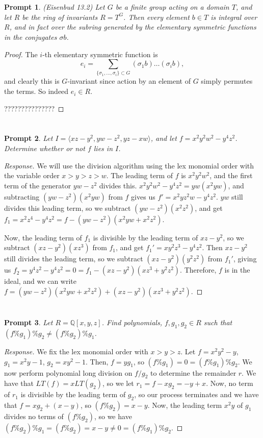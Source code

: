 \documentclass[Letter,12pt]{article}
\newcommand{\q}{\mathbb{Q}}
\newcommand{\<}{\left\langle}
\renewcommand{\>}{\right\rangle}
\newcommand{\prob}[1]{\setcounter{section}{#1-1}\section{}}
\newtheorem*{prompt*}{Prompt}
\theoremstyle{definition}
\begin{document}
	
	\prob{17}
	\begin{prompt*}
		(Eisenbud 13.2) Let $G$ be a finite group acting on a domain $T$, and let $R$ be the ring of invariants $R = T^G$. Then every element $b\in T$ is integral over $R$, and in fact over the subring generated by the elementary symmetric functions in the conjugates $\sigma b$.
	\end{prompt*}
	
	\begin{proof}
		The $i$-th elementary symmetric function is \[e_i = \sum_{\{\sigma_1, \ldots, \sigma_i\} \subset G} (\sigma_1 b)\ldots (\sigma_i b),\] and clearly this is $G$-invariant since action by an element of $G$ simply permutes the terms. So indeed $e_i\in R$.
		
		???????????????
	\end{proof}
	
	
	
	\prob{21}
	\begin{prompt*}
		Let $I = \langle xz-y^2, yw-z^2, yz-xw\rangle$, and let $f = x^2y^2w^2-y^4z^2$. Determine whether or not $f$ lies in $I$.
	\end{prompt*}
	\begin{proof}[Response]
		We will use the division algorithm using the lex monomial order with the variable order $x>y>z>w$. The leading term of $f$ is $x^2y^2w^2$, and the first term of the generator $yw-z^2$ divides this. $x^2y^2w^2-y^4z^2 = yw(x^2yw)$, and subtracting $(yw-z^2)(x^2yw)$ from $f$ gives us $f' = x^2yz^2w - y^4z^2$. $yw$ still divides this leading term, so we subtract $(yw-z^2)(x^2z^2)$, and get $f_1 = x^2z^4 - y^4z^2 = f - (yw-z^2)(x^2yw + x^2z^2)$.
		
		Now, the leading term of $f_1$ is divisible by the leading term of $xz-y^2$, so we subtract $(xz-y^2)(xz^3)$ from $f_1$, and get $f_1' = xy^2z^3 - y^4z^2$. Then $xz-y^2$ still divides the leading term, so we subtract $(xz-y^2)(y^2z^2)$ from $f_1'$, giving us $f_2 = y^4z^2-y^4z^2 = 0 = f_1 - (xz-y^2)(xz^3+y^2z^2)$. Therefore, $f$ is in the ideal, and we can write $f = (yw-z^2)(x^2yw+x^2z^2) + (xz-y^2)(xz^3+y^2z^2)$.
	\end{proof}
	
	
	\prob{22}
	\begin{prompt*}
		Let $R=\q[x,y,z]$. Find polynomials, $f,g_1,g_2\in R$ such that $(f\%g_1)\%g_2\neq (f\%g_2)\%g_1$.
	\end{prompt*}
	\begin{proof}[Response]
		We fix the lex monomial order with $x>y>z$. Let $f=x^2y^2-y$, $g_1=x^2y-1$, $g_2=xy^2-1$. Then, $f=yg_1$, so $(f\%g_1)=0=(f\%g_1)\%g_2$. We now perform polynomial long division on $f/g_2$ to determine the remainder $r$. We have that $LT(f)=xLT(g_2)$, so we let $r_1=f-xg_2=-y+x$. Now, no term of $r_1$ is divisible by the leading term of $g_2$, so our process terminates and we have that $f=xg_2+(x-y)$, so $(f\%g_2)=x-y$. Now, the leading term $x^2y$ of $g_1$ divides no terms of $(f\%g_2)$, so we have $(f\%g_2)\%g_1=(f\%g_2)=x-y\neq 0 =(f\%g_1)\%g_2$.
	\end{proof}
	
	
	
\end{document}
